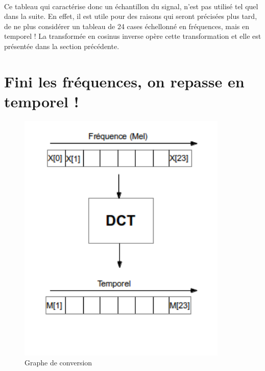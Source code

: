 \paragraph{}
	Ce tableau qui caractérise donc un échantillon du signal, n'est pas utilisé tel quel dans la suite. En effet, il
	est utile pour des raisons qui seront précisées plus tard, de ne plus considérer un tableau de 24 cases échellonné
	en fréquences, mais en temporel ! La transformée en cosinus inverse opère cette transformation et elle est présentée
	dans la section précédente.
	
		\section{Fini les fréquences, on repasse en temporel !}
\begin{figure}[H]
	\begin{center}
		\includegraphics[width=10cm]{Images/DCTschema.png} 
	\end{center}
	\caption{Graphe de conversion}
\end{figure}
